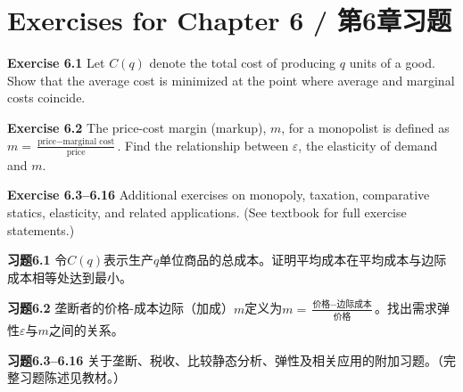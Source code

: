 \section{Exercises for Chapter 6 / 第6章习题}

\begin{original}
\textbf{Exercise 6.1} Let $C(q)$ denote the total cost of producing $q$ units of a good. Show that the average cost is minimized at the point where average and marginal costs coincide.

\textbf{Exercise 6.2} The price-cost margin (markup), $m$, for a monopolist is defined as $m = \frac{\text{price} - \text{marginal cost}}{\text{price}}$. Find the relationship between $\varepsilon$, the elasticity of demand and $m$.

\textbf{Exercise 6.3--6.16} Additional exercises on monopoly, taxation, comparative statics, elasticity, and related applications. (See textbook for full exercise statements.)
\end{original}
\begin{translation}
\textbf{习题6.1} 令$C(q)$表示生产$q$单位商品的总成本。证明平均成本在平均成本与边际成本相等处达到最小。

\textbf{习题6.2} 垄断者的价格-成本边际（加成）$m$定义为$m = \frac{\text{价格} - \text{边际成本}}{\text{价格}}$。找出需求弹性$\varepsilon$与$m$之间的关系。

\textbf{习题6.3--6.16} 关于垄断、税收、比较静态分析、弹性及相关应用的附加习题。（完整习题陈述见教材。）
\end{translation}
